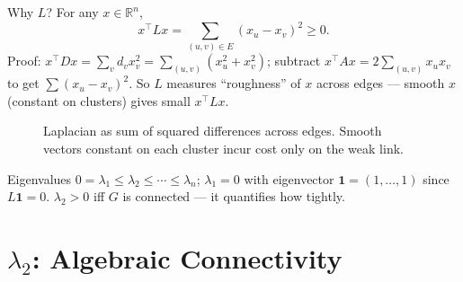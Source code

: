 Why $L$? For any $x\in\mathbb{R}^n$,
\begin{equation}
x^{\top}Lx=\sum_{(u,v)\in E}(x_u-x_v)^2\ge0.
\label{eq:lap-quad}
\end{equation}
Proof: $x^{\top}Dx=\sum_v d_vx_v^2=\sum_{(u,v)}(x_u^2+x_v^2)$; subtract $x^{\top}Ax=2\sum_{(u,v)}x_ux_v$ to get $\sum(x_u-x_v)^2$. So $L$ measures ``roughness'' of $x$ across edges --- smooth $x$ (constant on clusters) gives small $x^{\top}Lx$.

\begin{figure}[h]\centering
{}
\caption{Laplacian as sum of squared differences across edges. Smooth vectors constant on each cluster incur cost only on the weak link.}
\label{fig:laplacian}
\end{figure}

Eigenvalues $0=\lambda_1\le\lambda_2\le\cdots\le\lambda_n$; $\lambda_1=0$ with eigenvector $\mathbf{1}=(1,\dots,1)$ since $L\mathbf{1}=0$. $\lambda_2>0$ iff $G$ is connected --- it quantifies how tightly.

\section{\texorpdfstring{$\lambda_2$: Algebraic Connectivity}{lambda2: Algebraic Connectivity}}
\label{sec:lambda2}

